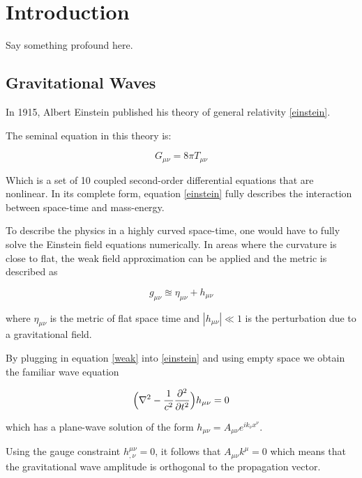 \chapter{Introduction}

	Say something profound here.

	\section{Gravitational Waves}\label{gravitational waves}
	In 1915, Albert Einstein published his theory of general relativity \ref{einstein}.
	
	The seminal equation in this theory is:
	
	\begin{equation} \label{einstein}
	G_{\mu \nu} = 8 \pi T_{\mu \nu}
	\end{equation}
	
	Which is a set of 10 coupled second-order differential equations that are nonlinear.  In its complete form, equation \ref{einstein} fully describes the interaction between space-time and mass-energy. 
	
	
	To describe the physics in a highly curved space-time, one would have to fully solve the Einstein field equations numerically. In areas where the curvature is close to flat,  the weak field approximation can be applied and the metric is described as	
	
	\begin{equation} \label{weak}
	g_{\mu \nu}  \approxeq \eta_{\mu \nu} + h_{\mu \nu}
	\end{equation}
	
	where $\eta_{\mu \nu}$ is the metric of flat space time and $|h_{\mu \nu}| \ll 1$ is the perturbation due to a gravitational field.
	
	By plugging in equation \ref{weak} into \ref{einstein} and using empty space we obtain the familiar wave equation
	
	\begin{equation} \label{wave}
	\Big(\nabla^2 - \frac{1}{c^2} \pdv[2]{t} \Big) h_{\mu \nu}  = 0
	\end{equation}

	which has a plane-wave solution of the form $h_{\mu \nu} = A_{\mu \nu} e^{ik_{\nu} x^{\nu}}$. 
	
	Using the gauge constraint $h^{\mu \nu}_{,\nu} = 0$, it follows that $A_{\mu \nu} k^{\mu} = 0$ which means that the gravitational wave amplitude is orthogonal to the propagation vector.
	
